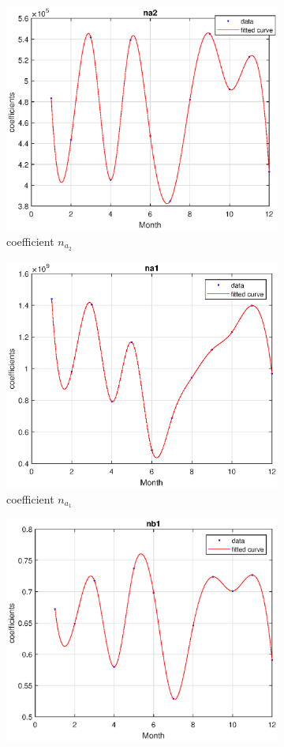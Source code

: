 \documentclass[a4paper,12pt]{article}
\numberwithin{equation}{section}
\begin{document}
\begin{figure}[H]
\centering
\begin{subfigure}{.5\textwidth}
  \centering
  \includegraphics[width=.7\linewidth]{coeffna2.eps}
  \caption{coefficient $n_{a_{2}}$}
  \label{fig:coeffna2}
\end{subfigure}%
\begin{subfigure}{.5\textwidth}
  \centering
  \includegraphics[width=.7\linewidth]{coeffna1.eps}
  \caption{coefficient $n_{a_{1}}$}
  \label{fig:coeffna1}
\end{subfigure}
\begin{subfigure}{.5\textwidth}
  \centering
  \includegraphics[width=.7\linewidth]{coeffnb1.eps}

\end{subfigure}
\end{figure}
\end{document}
